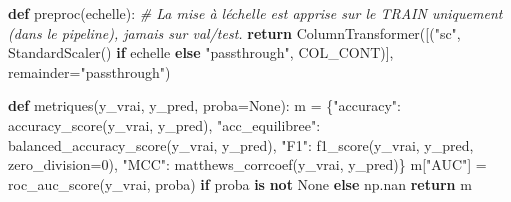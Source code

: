 \documentclass[
  10pt,
]{article}
\newenvironment{Shaded}{}{}
\newcommand{\CommentTok}[1]{\textcolor[rgb]{0.38,0.63,0.69}{\textit{#1}}}
\newcommand{\ControlFlowTok}[1]{\textcolor[rgb]{0.00,0.44,0.13}{\textbf{#1}}}
\newcommand{\DecValTok}[1]{\textcolor[rgb]{0.25,0.63,0.44}{#1}}
\newcommand{\KeywordTok}[1]{\textcolor[rgb]{0.00,0.44,0.13}{\textbf{#1}}}
\newcommand{\NormalTok}[1]{#1}
\newcommand{\OperatorTok}[1]{\textcolor[rgb]{0.40,0.40,0.40}{#1}}
\newcommand{\StringTok}[1]{\textcolor[rgb]{0.25,0.44,0.63}{#1}}
\newcommand{\VariableTok}[1]{\textcolor[rgb]{0.10,0.09,0.49}{#1}}
\begin{document}
\begin{Shaded}
\begin{Highlighting}[]
\KeywordTok{def}\NormalTok{ preproc(echelle):}
    \CommentTok{\# La mise à l\textquotesingle{}échelle est apprise sur le TRAIN uniquement (dans le pipeline), jamais sur val/test.}
    \ControlFlowTok{return}\NormalTok{ ColumnTransformer([(}\StringTok{"sc"}\NormalTok{, StandardScaler() }\ControlFlowTok{if}\NormalTok{ echelle }\ControlFlowTok{else} \StringTok{"passthrough"}\NormalTok{, COL\_CONT)],}
\NormalTok{                             remainder}\OperatorTok{=}\StringTok{"passthrough"}\NormalTok{)}

\KeywordTok{def}\NormalTok{ metriques(y\_vrai, y\_pred, proba}\OperatorTok{=}\VariableTok{None}\NormalTok{):}
\NormalTok{    m }\OperatorTok{=}\NormalTok{ \{}\StringTok{"accuracy"}\NormalTok{: accuracy\_score(y\_vrai, y\_pred),}
         \StringTok{"acc\_equilibree"}\NormalTok{: balanced\_accuracy\_score(y\_vrai, y\_pred),}
         \StringTok{"F1"}\NormalTok{: f1\_score(y\_vrai, y\_pred, zero\_division}\OperatorTok{=}\DecValTok{0}\NormalTok{),}
         \StringTok{"MCC"}\NormalTok{: matthews\_corrcoef(y\_vrai, y\_pred)\}}
\NormalTok{    m[}\StringTok{"AUC"}\NormalTok{] }\OperatorTok{=}\NormalTok{ roc\_auc\_score(y\_vrai, proba) }\ControlFlowTok{if}\NormalTok{ proba }\KeywordTok{is} \KeywordTok{not} \VariableTok{None} \ControlFlowTok{else}\NormalTok{ np.nan}
    \ControlFlowTok{return}\NormalTok{ m}


\end{Highlighting}
\end{Shaded}
\end{document}
